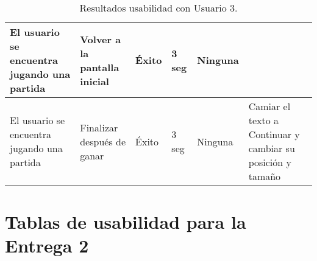 \begin{table}[h]
\begin{center}
\begin{tabular}{|p{2.5cm}|p{1.75cm}|p{1.25cm}|p{1.25cm}|p{2.75cm}|p{3.5cm}|}
      \hline
      El usuario se encuentra jugando una partida
      & Volver a la pantalla inicial
      & Éxito
      & 3 seg
      & Ninguna
      &\\

      \hline
      El usuario se encuentra jugando una partida
      & Finalizar después de ganar
      & Éxito
      & 3 seg
      & Ninguna
      & Camiar el texto a Continuar y cambiar su posición y tamaño\\

      \hline

    \end{tabular}

    \caption{Resultados usabilidad con Usuario 3.}
    \label{tabla-bocetos-usuario3}

  \end{center}
\end{table}

\FloatBarrier


\section{Tablas de usabilidad para la Entrega 2} \label{tablas-usabilidad-entrega-2}

